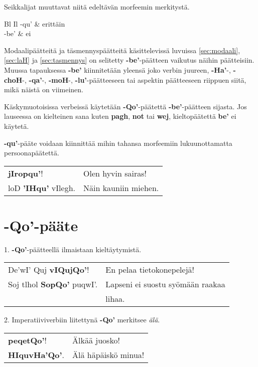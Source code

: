 \documentclass{book}
\begin{document}
Seikkalijat muuttavat niitä edeltävän morfeemin merkitystä.

\begin{tabular}{Bl Il}
    -qu' & erittäin \\
    -be' & ei \\
\end{tabular}

Modaalipäätteitä ja täsmennyspäätteitä käsittelevissä luvuissa \ref{sec:modaali}, \ref{sec:laH} ja \ref{sec:tasmennys} on selitetty \textbf{-be'}-päätteen vaikutus näihin päätteisiin.
Muussa tapauksessa \textbf{-be'} kiinnitetään yleensä joko verbin juureen, \textbf{-Ha'}-, \textbf{-choH}-, \textbf{-qa'}-, \textbf{-moH}-, \textbf{-lu'}-päätteeseen tai aspektin päätteeseen riippuen siitä, mikä näistä on viimeinen.

Käskymuotoisissa verbeissä käytetään \textbf{-Qo'}-päätettä \textbf{-be'}-päätteen sijasta.
Jos lauseessa on kielteinen sana kuten \textbf{pagh}, \textbf{not} tai \textbf{wej}, kieltopäätettä \textbf{be'} ei käytetä.

\textbf{-qu'}-pääte voidaan kiinnittää mihin tahansa morfeemiin lukuunottamatta persoonapäätettä.

\begin{tabular}{l l}
    \textbf{jIropqu'}! & Olen hyvin sairas! \\
    loD \textbf{'IHqu'} vIlegh. & Näin kauniin miehen. \\
\end{tabular}

\section{-Qo'-pääte}

1. \textbf{-Qo'}-päätteellä ilmaistaan kieltäytymistä.

\begin{tabular}{l l}
    De'wI' Quj \textbf{vIQujQo'}! & En pelaa tietokonepelejä! \\
    Soj tlhol \textbf{SopQo'} puqwI'. & Lapseni ei suostu syömään raakaa \\
    & lihaa. \\
\end{tabular}

2. Imperatiiviverbiin liitettynä \textbf{-Qo'} merkitsee \textit{älä}.

\begin{tabular}{l l}
    \textbf{peqetQo'}! & Älkää juosko! \\
    \textbf{HIquvHa'Qo'}. & Älä häpäiskö minua! \\
\end{tabular}
\end{document}
